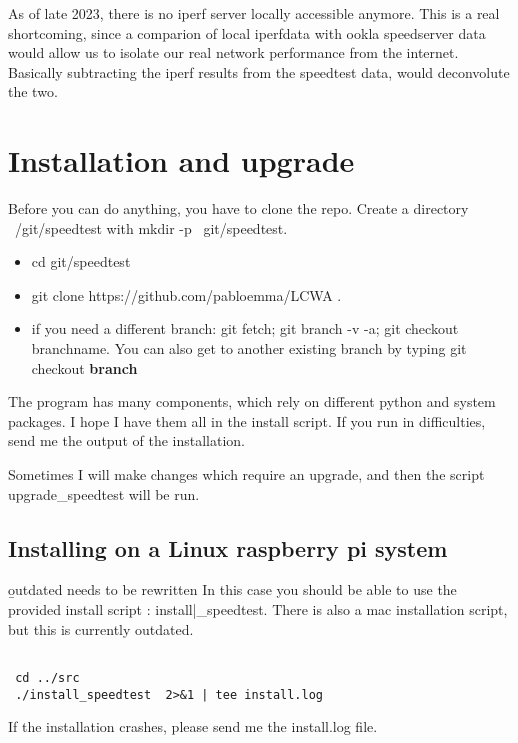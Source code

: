 \documentclass[11pt]{article}
\begin{document}
As of late 2023, there is no iperf server locally accessible anymore. This is a real shortcoming, since a comparion of local iperfdata with ookla speedserver data would allow us to isolate our real network performance from the internet. Basically subtracting the iperf results from the speedtest data, would deconvolute the two.

\section{Installation and upgrade}

Before you can do anything, you have to clone the repo. Create a directory ~/git/speedtest with mkdir -p ~git/speedtest.

\begin{itemize}
\item cd git/speedtest
\item git clone https://github.com/pabloemma/LCWA .
\item if you need a different branch: git fetch; git branch -v -a; git checkout branchname. You can also get to another existing branch by typing git checkout {\bf branch}

\end{itemize}
The program has many components, which rely on different python and system packages. I hope I have them all in the install script. If you run in difficulties, send me the output of the installation.

Sometimes I will make changes which require an upgrade, and then the script upgrade\_speedtest will be run.

\vspace{3cm}

\subsection{Installing on a Linux raspberry pi system}
{\b outdated needs to be rewritten}
In this case you should be able to use the provided install script : install|\_speedtest. There is also a mac installation script, but this is currently outdated.
\begin{verbatim}

 cd ../src
 ./install_speedtest  2>&1 | tee install.log
\end{verbatim}

If the installation crashes, please send me the install.log file.
\end{document}
